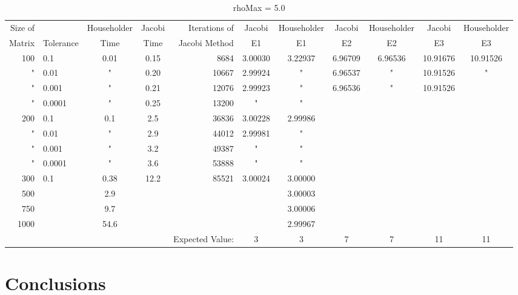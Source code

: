 \documentclass[twocolumn, groupedaddress]{revtex4-1}
\begin{document}
	
	\begin{table*}[t]
		\centering
		\begin{tabular}{ r | l || c | c | r | c | c | c | c | c | c|}
			Size of &           & Householder & Jacobi & Iterations of & Jacobi & Householder & Jacobi & Householder & Jacobi & Householder \\
			Matrix  & Tolerance &    Time     &  Time  & Jacobi Method  &   E1   &      E1 &   E2   &      E2 &   E3   &      E3     \\
			\hline
			100 & 0.1    & 0.01 &  0.15 &  8684 & 3.00030 & 3.22937 &  6.96709 & 6.96536 & 10.91676 & 10.91526 \\
			"  & 0.01   &  "   &  0.20 & 10667 & 2.99924 &    "    &  6.96537 & " & 10.91526 & "\\
			"  & 0.001  &  "   &  0.21 & 12076 & 2.99923 &    "    & 6.96536 & " & 10.91526 &\\
			"  & 0.0001 &  "   &  0.25 & 13200 &    "    &    "   &   &  &  & \\
			200 & 0.1    & 0.1  &  2.5  & 36836 & 3.00228 & 2.99986 &   &  &  &\\
			"  & 0.01   &  "   &  2.9  & 44012 & 2.99981 &    "    &   &  &  &\\
			"  & 0.001  &  "   &  3.2  & 49387 &    "    &    "    &   &  &  &\\
			"  & 0.0001 &  "   &  3.6  & 53888 &    "    &    "    &   &  &  &\\
			300 & 0.1    & 0.38 & 12.2  & 85521 & 3.00024 & 3.00000 &   &  &  &\\
			500 &        & 2.9  &       &       &         & 3.00003&   &  &  & \\
			750 &        & 9.7  &       &       &         & 3.00006 &   &  &  &\\ 
			1000 &        & 54.6 &       &       &         & 2.99967 &   &  &  &\\
			\hline
			 & & & & Expected Value: & 3 & 3 & 7 & 7 & 11 & 11 &
			
		\end{tabular}
		\caption{rhoMax = 5.0 \label{table:relults}}
	\end{table*}

\section{Conclusions}


\end{document}
